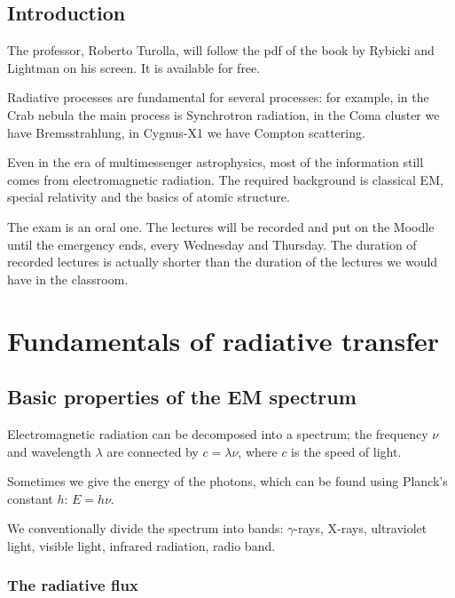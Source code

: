 \documentclass[main.tex]{subfiles}
\begin{document}
\section*{Introduction}

The professor, Roberto Turolla, will follow the pdf of the book by Rybicki and Lightman \cite{rybickiRadiativeProcessesAstrophysics1979} on his screen. It is available for free.

Radiative processes are fundamental for several processes: for example, in the Crab nebula the main process is Synchrotron radiation, in the Coma cluster we have Bremsstrahlung, in Cygnus-X1 we have Compton scattering. 

Even in the era of multimessenger astrophysics, most of the information still comes from electromagnetic radiation. 
The required background is classical EM, special relativity and the basics of atomic structure. 

The exam is an oral one. The lectures will be recorded and put on the Moodle until the emergency ends, every Wednesday and Thursday. 
The duration of recorded lectures is actually shorter than the duration of the lectures we would have in the classroom.

\chapter{Fundamentals of radiative transfer}

\section{Basic properties of the EM spectrum}


Electromagnetic radiation can be decomposed into a spectrum; the frequency \(\nu \) and wavelength \(\lambda \) are connected by \(c = \lambda \nu \), where \(c\) is the speed of light. 

Sometimes we give the energy of the photons, which can be found using Planck's constant \(h\): \(E = h \nu \). 

We conventionally divide the spectrum into bands: \(\gamma \)-rays, X-rays, ultraviolet light, visible light, infrared radiation, radio band.

\subsection{The radiative flux}
\end{document}
